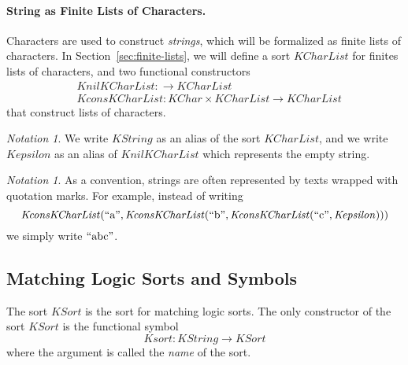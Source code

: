 \documentclass[UTF8,11pt]{article}
\newcounter{thmcounter}
\theoremstyle{plain}
\theoremstyle{definition}
\theoremstyle{remark}
\newtheorem{notation}   [thmcounter]{Notation}
\newcommand{\KChar}{\mathit{KChar}}
\newcommand{\KCharList}{\mathit{KCharList}}
\newcommand{\KString}{\mathit{KString}}
\newcommand{\Kepsilon}{\mathit{Kepsilon}}
\newcommand{\KSort}{\mathit{KSort}}
\newcommand{\Ksort}{\mathit{Ksort}}
\newcommand{\KnilKCharList}{\mathit{KnilKCharList}}
\newcommand{\KconsKCharList}{\mathit{KconsKCharList}}
\newcommand{\quot}[1]{\mathrm{``#1"}}
\begin{document}
\paragraph{String as Finite Lists of Characters.}\quad
Characters are used to construct \emph{strings}, which will be formalized as finite lists of characters.
In Section~\cref{sec:finite-lists}, we will define a sort $\KCharList$ for finites lists of characters, and two functional constructors
\begin{align*}
 & \KnilKCharList \colon \to \KCharList \\
 & \KconsKCharList \colon \KChar \times \KCharList \to \KCharList
\end{align*}
that construct lists of characters.

\begin{notation}
	We write $\KString$ as an alias of the sort $\KCharList$, and we write $\Kepsilon$ as an alias of $\KnilKCharList$ which represents the empty string.
\end{notation}

\begin{notation}
	As a convention, strings are often represented by texts wrapped with quotation marks. 
	For example, instead of writing
	$$
	\KconsKCharList(\quot{a}, \KconsKCharList(\quot{b}, \KconsKCharList(\quot{c}, \Kepsilon)))
	$$
	we simply write $\quot{abc}$.
\end{notation}

\subsection{Matching Logic Sorts and Symbols}

The sort $\KSort$ is the sort for matching logic sorts.
The only constructor of the sort $\KSort$ is the functional symbol
\begin{equation*}
\Ksort \colon \KString \to \KSort
\end{equation*}
where the argument is called the \emph{name} of the sort. 
\end{document}
